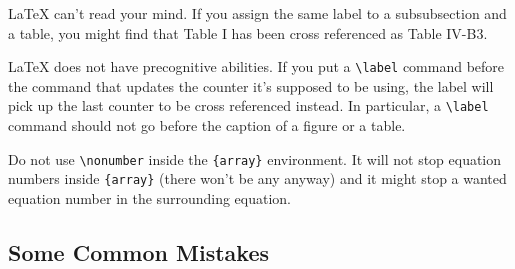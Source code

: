 \documentclass[conference]{IEEEtran}
\begin{document}
    {\LaTeX} can't read your mind. If you assign the same label to a subsubsection and a 
    table, you might find that Table I has been cross referenced as Table IV-B3. 

    {\LaTeX} does not have precognitive abilities. If you put a \verb|\label| command 
    before the command that updates the counter it's supposed to be using, the label will 
    pick up the last counter to be cross referenced instead. In particular, a 
    \verb|\label| command should not go before the caption of a figure or a table.

    Do not use \verb|\nonumber| inside the \verb|{array}| environment. It will not stop 
    equation numbers inside \verb|{array}| (there won't be any anyway) and it might stop a 
    wanted equation number in the surrounding equation.


    \subsection{Some Common Mistakes}\label{SCM}
\end{document}
